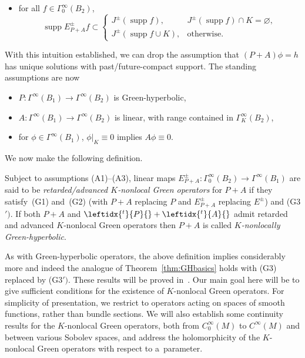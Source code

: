 \documentclass[11pt]{article}
\numberwithin{equation}{section}
\numberwithin{equation}{section}
\newcommand{\GoinX}[1]{\Gamma_0^\infty({#1})}
\DeclareMathOperator{\supp}{supp}
\newcommand{\adj}[1]{\leftidx{^{t}}{#1}{}}
\begin{document}
 \begin{itemize}\setlength{\leftskip}{0.10cm}
\item[(G3${}'$)] for all $f\in \GoinX{B_2}$,
 	\begin{equation*}\displaystyle \supp E_{P+A}^{\pm} f \subset
 		\begin{cases} J^{\pm}(\supp f), & J^\pm(\supp f)\cap K=\varnothing,\\
 			J^{\pm}(\supp f\cup K), & \text{otherwise.}
 	\end{cases}\end{equation*}
 \end{itemize}
 With this intuition established, we can drop the assumption that $(P+A)\phi=h$ has unique solutions with past/future-compact support. The standing assumptions are now
 \begin{itemize}
 	\item[(A1)] $P\colon\Gamma^\infty(B_1)\to \Gamma^\infty(B_2)$ is Green-hyperbolic,
 	\item[(A2)] $A\colon\Gamma^\infty(B_1)\to \Gamma^\infty(B_2)$ is linear, with range contained in $\Gamma^\infty_K(B_2)$,
 	\item[(A3)] for $\phi\in \Gamma^\infty(B_1)$, $\phi|_K\equiv 0$ implies $A\phi\equiv 0$.
 \end{itemize}
 We now make the following definition.
 \begin{Definition}\label{def:KnonlocalGops}
 	Subject to assumptions (A1)--(A3), linear maps $E_{P+A}^{\pm}\colon\GoinX{B_2}\to \Gamma^\infty(B_1)$ are said to be \emph{retarded/advanced $K$-nonlocal Green operators} for $P+A$ if they satisfy~(G1) and~(G2) \big(with $P+A$ replacing $P$ and $E_{P+A}^\pm$ replacing $E^\pm$\big) and (G3${}')$. If both $P+A$ and $\adj{P}+\adj{A}$ admit retarded and advanced $K$-nonlocal Green operators then $P+A$ is called \emph{$K$-nonlocally Green-hyperbolic}.
 \end{Definition}



 As with Green-hyperbolic operators, the above definition implies considerably more and indeed the analogue of Theorem~\ref{thm:GHbasics} holds with (G3) replaced by (G3${}')$. These results will be proved in~\cite{FewVer:20xx}. Our main goal here will be to give sufficient
 conditions for the existence of $K$-nonlocal Green operators. For simplicity of presentation, we restrict to operators acting on spaces of smooth functions, rather than bundle sections. We will also establish some continuity results for the $K$-nonlocal Green operators, both from $C_0^\infty(M)$ to $C^\infty(M)$ and between various Sobolev spaces, and address the
 holomorphicity of the $K$-nonlocal Green operators with respect to a~parameter.
\end{document}
